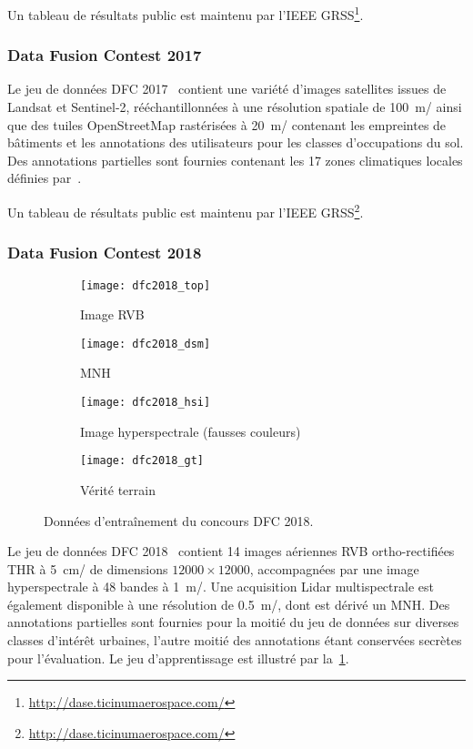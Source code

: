 Un tableau de résultats public est maintenu par l'\gls{IEEE} \gls{GRSS}\footnote{\url{http://dase.ticinumaerospace.com/}}.

\subsubsection{Data Fusion Contest 2017}

Le jeu de données \gls{DFC} 2017~\cite{tuia_2017_2017} contient une variété d'images satellites issues de Landsat et Sentinel-2, rééchantillonnées à une résolution spatiale de \SI{100}{\meter/\px} ainsi que des tuiles OpenStreetMap rastérisées à \SI{20}{\meter/\px} contenant les empreintes de bâtiments et les annotations des utilisateurs pour les classes d'occupations du sol. Des annotations partielles sont fournies contenant les 17 zones climatiques locales définies par~\citet{stewart_local_2012}.

Un tableau de résultats public est maintenu par l'\gls{IEEE} \gls{GRSS}\footnote{\url{http://dase.ticinumaerospace.com/}}.

\subsubsection{Data Fusion Contest 2018}

\begin{figure}
  \begin{subfigure}{\textwidth}
    \texttt{[image: dfc2018\_top]}
    \caption{Image \gls{RVB}}
  \end{subfigure}
  \begin{subfigure}{\textwidth}
    \texttt{[image: dfc2018\_dsm]}
    \caption{\gls{MNH}}
  \end{subfigure}
  \begin{subfigure}{\textwidth}
    \texttt{[image: dfc2018\_hsi]}
    \caption{Image hyperspectrale (fausses couleurs)}
  \end{subfigure}
  \begin{subfigure}{\textwidth}
    \texttt{[image: dfc2018\_gt]}
    \caption{Vérité terrain}
  \end{subfigure}
  \caption{Données d'entraînement du concours \gls{DFC} 2018.}
  \label{fig:dfc2018}
\end{figure}

Le jeu de données \gls{DFC} 2018~\cite{le_saux_2018_2018} contient 14 images aériennes \gls{RVB} ortho-rectifiées \gls{THR} à \SI{5}{\centi\meter/\px} de dimensions $12000\times12000$, accompagnées par une image hyperspectrale à 48 bandes à \SI{1}{\meter/\px}. Une acquisition \gls{Lidar} multispectrale est également disponible à une résolution de \SI{0,5}{\meter/\px}, dont est dérivé un \gls{MNH}. Des annotations partielles sont fournies pour la moitié du jeu de données sur diverses classes d'intérêt urbaines, l'autre moitié des annotations étant conservées secrètes pour l'évaluation. Le jeu d'apprentissage est illustré par la~\cref{fig:dfc2018}.


